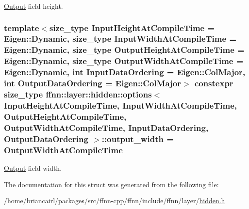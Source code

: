 \hyperlink{classffnn_1_1layer_1_1_output}{Output} field height. 

\hypertarget{structffnn_1_1layer_1_1hidden_1_1options_a1f31ac8402dd47157ea7dd8eba82c017}{
\subsubsection[{output\-\_\-width}]{\setlength{\rightskip}{0pt plus 5cm}template$<$size\-\_\-type Input\-Height\-At\-Compile\-Time = Eigen\-::\-Dynamic, size\-\_\-type Input\-Width\-At\-Compile\-Time = Eigen\-::\-Dynamic, size\-\_\-type Output\-Height\-At\-Compile\-Time = Eigen\-::\-Dynamic, size\-\_\-type Output\-Width\-At\-Compile\-Time = Eigen\-::\-Dynamic, int Input\-Data\-Ordering = Eigen\-::\-Col\-Major, int Output\-Data\-Ordering = Eigen\-::\-Col\-Major$>$ constexpr {\bf size\-\_\-type} {\bf ffnn\-::layer\-::hidden\-::options}$<$ Input\-Height\-At\-Compile\-Time, Input\-Width\-At\-Compile\-Time, Output\-Height\-At\-Compile\-Time, Output\-Width\-At\-Compile\-Time, Input\-Data\-Ordering, Output\-Data\-Ordering $>$\-::output\-\_\-width = Output\-Width\-At\-Compile\-Time\hspace{0.3cm}{\ttfamily [static]}}}\label{structffnn_1_1layer_1_1hidden_1_1options_a1f31ac8402dd47157ea7dd8eba82c017}


\hyperlink{classffnn_1_1layer_1_1_output}{Output} field width. 



The documentation for this struct was generated from the following file\-:\begin{DoxyCompactItemize}
\item 
/home/briancairl/packages/src/ffnn-\/cpp/ffnn/include/ffnn/layer/\hyperlink{hidden_8h}{hidden.\-h}\end{DoxyCompactItemize}
